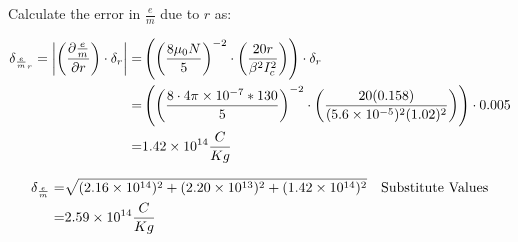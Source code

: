 \documentclass[12pt]{article}
\newcommand{\paren}[1]{\left( {#1} \right)}
\newcommand{\abs}[1]{\left| {#1} \right|}
\begin{document}
Calculate the error in $\frac{e}{m}$ due to $r$ as:

\begin{align}
	\delta_{\frac{e}{m}_r} = \abs{\paren{\frac{\partial \frac{e}{m}}{\partial r}}\cdot\delta_r} =& \paren{\paren{\frac{8\mu_0N}{5}}^{-2}\cdot\paren{\frac{20r}{\beta^2I_c^2}}}\cdot \delta_r \label{e:FixA_err_r} \\
	=& \paren{\paren{\frac{8\cdot4\pi\times10^{-7}*130}{5}}^{-2}\cdot\paren{\frac{20(0.158)}{(5.6\times10^{-5})^2(1.02)^2}}}\cdot0.005 \notag \\
	=& 1.42\times10^{14} \frac{C}{Kg} \notag
\end{align}

\begin{align}
	\delta_\frac{e}{m} =& \sqrt{(2.16\times10^{14})^2+(2.20\times10^{13})^2+(1.42\times10^{14})^2} && \text{Substitute Values} \notag \\
	=& 2.59\times10^{14} \frac{C}{Kg} \label{v:FixA_err}
\end{align}
\end{document}
